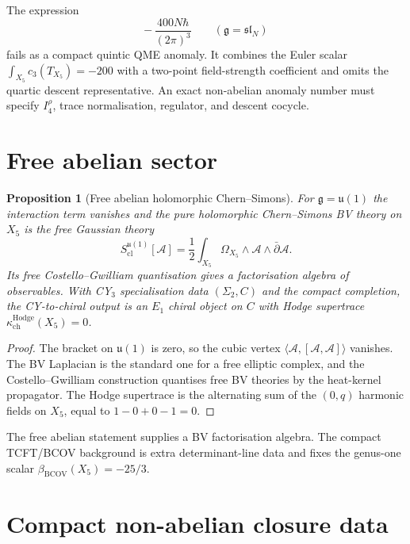 \documentclass[11pt]{amsart}
\newtheorem{proposition}[theorem]{Proposition}
\providecommand{\kchHodge}{\kappa_{\mathrm{ch}}^{\mathrm{Hodge}}}
\providecommand{\bBCOV}{\beta_{\mathrm{BCOV}}}
\providecommand{\fg}{\mathfrak{g}}
\providecommand{\fu}{\mathfrak{u}}
\providecommand{\fsl}{\mathfrak{sl}}
\providecommand{\cA}{\mathcal{A}}
\begin{document}
The expression
\[
  -\,\frac{400N\hbar}{(2\pi)^3}
  \qquad(\fg=\fsl_N)
\]
fails as a compact quintic QME anomaly. It combines the Euler scalar
$\int_{X_5}c_3(T_{X_5})=-200$ with a two-point field-strength
coefficient and omits the quartic descent representative. An exact
non-abelian anomaly number must specify $I_4^\rho$, trace
normalisation, regulator, and descent cocycle.

\section*{Free abelian sector}
\label{sec:hcs-quintic-abelian}

\begin{proposition}[Free abelian holomorphic Chern--Simons]
\label{prop:hcs-quintic-abelian}
For $\fg=\fu(1)$ the interaction term vanishes and the pure
holomorphic Chern--Simons BV theory on $X_5$ is the free Gaussian
theory
\[
  S_{\mathrm{cl}}^{\fu(1)}[\cA]
  =
  \frac{1}{2}\int_{X_5}\Omega_{X_5}\wedge
  \cA\wedge\bar\partial\cA .
\]
Its free Costello--Gwilliam quantisation gives a factorisation algebra
of observables. With CY$_3$ specialisation data $(\Sigma_2,C)$ and the
compact completion, the CY-to-chiral output is an $E_1$ chiral object
on $C$ with Hodge supertrace $\kchHodge(X_5)=0$.
\end{proposition}

\begin{proof}
The bracket on $\fu(1)$ is zero, so the cubic vertex
$\langle\cA,[\cA,\cA]\rangle$ vanishes. The BV Laplacian is the
standard one for a free elliptic complex, and the Costello--Gwilliam
construction quantises free BV theories by the heat-kernel propagator.
The Hodge supertrace is the alternating sum of the $(0,q)$ harmonic
fields on $X_5$, equal to $1-0+0-1=0$.
\end{proof}

The free abelian statement supplies a BV factorisation algebra. The
compact TCFT/BCOV background is extra determinant-line data and fixes
the genus-one scalar $\bBCOV(X_5)=-25/3$.

\section*{Compact non-abelian closure data}
\label{sec:hcs-quintic-required-data}
\end{document}
